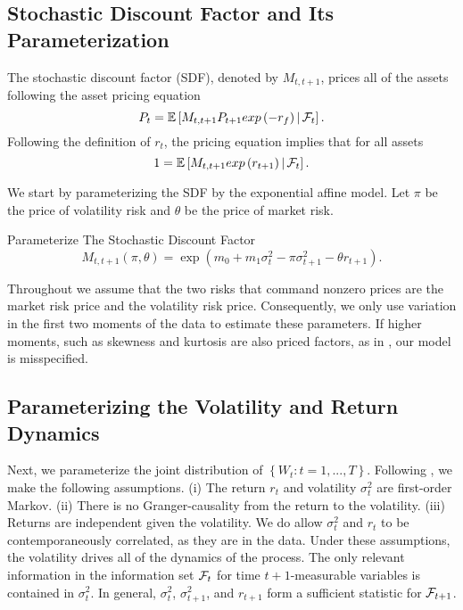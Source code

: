 \documentclass[11pt, letterpaper, twoside]{article}
\begin{document}
\subsection{Stochastic Discount Factor and Its Parameterization}\label{sec:deriving_sdf_functions}

The stochastic discount factor (SDF), denoted by $M_{t,t+1}$, prices all of the assets following the asset pricing equation 
  \begin{equation}
    P_t = \operatorname{\mathbb{E}}\left[M_{t,t+1} P_{t+1} exp\left(-r_f\right) \,\middle\vert\, \mathcal{F}_t \right]. 
  \end{equation}
Following the definition of $r_t$, the pricing equation implies that for all assets
\begin{equation}
1 = \operatorname{\mathbb{E}}\left[M_{t,t+1} exp\left(r_{t+1}\right) \,\middle\vert\, \mathcal{F}_t \right].
\end{equation}


We start by parameterizing the SDF by the exponential affine model. Let $\pi$ be the price of volatility risk and $\theta$ be the price of market risk.

\begin{defn}{Parameterize The Stochastic Discount Factor}
 \label{defn:SDF}
 \begin{equation}
 M_{t,t+1}(\pi, \theta) = \exp\left(m_{0} + m_1 \sigma_t^2 - \pi \sigma^2_{t+1} -
 \theta r_{t+1}\right). 
 \end{equation}
\end{defn}

Throughout we assume that the two risks that command nonzero prices are the market risk price and the volatility risk price. Consequently, we only use variation in the first two moments of the data to estimate these parameters. If higher moments, such as skewness and kurtosis are also priced factors, as in \textcites{harvey2000conditional, conrad2012exante, chang2013market}, our model is misspecified.





\subsection{Parameterizing the Volatility and Return Dynamics}

Next, we parameterize the joint distribution of $\left\lbrace W_t:t=1,...,T\right\rbrace $. 
Following \textcite{han2018leverage}, we make the following assumptions. (i) The return $r_t$ and volatility $\sigma^2_t$ are first-order Markov. (ii) There is no Granger-causality from the return to the volatility. (iii) Returns are independent given the volatility. We do allow $\sigma^2_{t}$ and $r_{t}$ to be contemporaneously correlated, as they are in the data. 
Under these assumptions, the volatility drives all of the dynamics of the process. The only relevant information in the information set $\mathcal{F}_{t}$ for time $t+1$-measurable variables is contained in $\sigma^2_t$. In general, $\sigma^2_t$, $\sigma^2_{t+1}$, and $r_{t+1}$ form a sufficient statistic for $\mathcal{F}_{t+1}$. 
\end{document}
